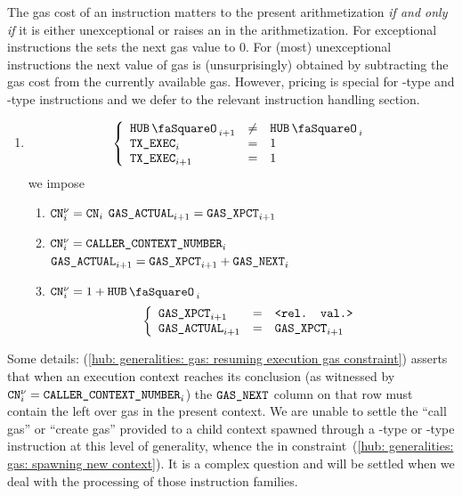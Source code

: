 The gas cost of an instruction matters to the present arithmetization \emph{if and only if} it is either unexceptional or raises an \oogxSH{} in the arithmetization.
For exceptional instructions the \zkEvm{} sets the next gas value to $0$.
For (most) unexceptional instructions the next value of gas is (unsurprisingly) obtained by subtracting the gas cost from the currently available gas.
However, pricing is special for -type and -type instructions and we defer to the relevant instruction handling section.
\begin{enumerate}[resume]
	\item \If 
		\[
			\left\{ \begin{array}{lcl}
				\hubStamp _{i + 1} & \neq & \hubStamp_{i} \\
				\txExec   _{i    } & =    & 1             \\
				\txExec   _{i + 1} & =    & 1             \\
			\end{array} \right.
		\]
		\Then we impose
		\begin{enumerate}
			\item\label{hub: generalities: gas: could blow up} \If $\texttt{CN}^{\nu}_{i} = \texttt{CN}_{i}$ \Then $\texttt{GAS}\texttt{\_ACTUAL}_{i + 1} = \texttt{GAS}\texttt{\_XPCT}_{i + 1}$
			\item\label{hub: generalities: gas: resuming execution gas constraint} \If $\texttt{CN}^{\nu}_{i} = \texttt{CALLER\_CONTEXT\_NUMBER}_{i}$ \Then
				$\texttt{GAS}\texttt{\_ACTUAL}_{i + 1} = \texttt{GAS}\texttt{\_XPCT}_{i + 1} + \texttt{GAS}\texttt{\_NEXT}_{i}$
			\item\label{hub: generalities: gas: spawning new context} \If $\cn\new_{i} = 1 + \hubStamp_{i}$ \Then 
				\[
					\left\{ \begin{array}{lcl}
						\texttt{GAS}\texttt{\_XPCT}_{i + 1} & = & \texttt{<rel. val.>}            \\
						\texttt{GAS}\texttt{\_ACTUAL}_{i + 1}   & = & \texttt{GAS}\texttt{\_XPCT}_{i + 1} \\
					\end{array} \right.
				\]
		\end{enumerate}
\end{enumerate}
Some details:
(\ref{hub: generalities: gas: resuming execution gas constraint}) asserts that when an execution context reaches its conclusion (as witnessed by $\texttt{CN}^{\nu}_{i} = \texttt{CALLER\_CONTEXT\_NUMBER}_{i}$) the $\texttt{GAS}\texttt{\_NEXT}$ column on that row must contain the left over gas in the present context.
We are unable to settle the ``call gas'' or ``create gas'' provided to a child context spawned through a -type or -type instruction at this level of generality, whence the \relevantValue{} in constraint~(\ref{hub: generalities: gas: spawning new context}). It is a complex question and will be settled when we deal with the processing of those instruction families.

